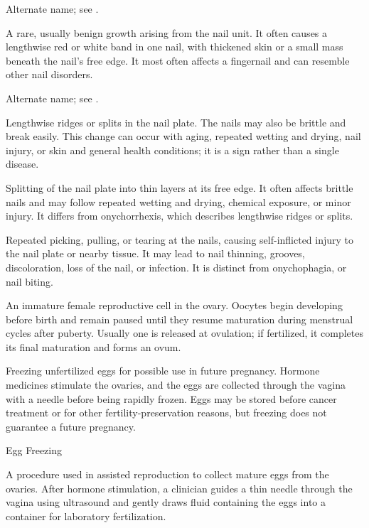  Alternate name; see
  .

 A rare, usually benign growth arising from
  the nail unit. It often causes a lengthwise red or white band in one
  nail, with thickened skin or a small mass beneath the nail's free
  edge. It most often affects a fingernail and can resemble other nail
  disorders.

 Alternate name; see
  .

 Lengthwise ridges or splits in the nail plate.
  The nails may also be brittle and break easily. This change can occur
  with aging, repeated wetting and drying, nail injury, or skin and
  general health conditions; it is a sign rather than a single disease.

 Splitting of the nail plate into thin layers at
  its free edge. It often affects brittle nails and may follow repeated
  wetting and drying, chemical exposure, or minor injury. It differs
  from onychorrhexis, which describes lengthwise ridges or splits.

 Repeated picking, pulling, or tearing at the
  nails, causing self-inflicted injury to the nail plate or nearby
  tissue. It may lead to nail thinning, grooves, discoloration, loss of
  the nail, or infection. It is distinct from onychophagia, or nail
  biting.

 An immature female reproductive cell in the ovary. Oocytes begin developing before birth and remain paused until they resume maturation during menstrual cycles after puberty. Usually one is released at ovulation; if fertilized, it completes its final maturation and forms an ovum.

 Freezing unfertilized eggs for possible use in future pregnancy. Hormone medicines stimulate the ovaries, and the eggs are collected through the vagina with a needle before being rapidly frozen. Eggs may be stored before cancer treatment or for other fertility-preservation reasons, but freezing does not guarantee a future pregnancy.

\synonyms
Egg Freezing

 A procedure used in assisted reproduction to collect mature eggs from the ovaries. After hormone stimulation, a clinician guides a thin needle through the vagina using ultrasound and gently draws fluid containing the eggs into a container for laboratory fertilization.


